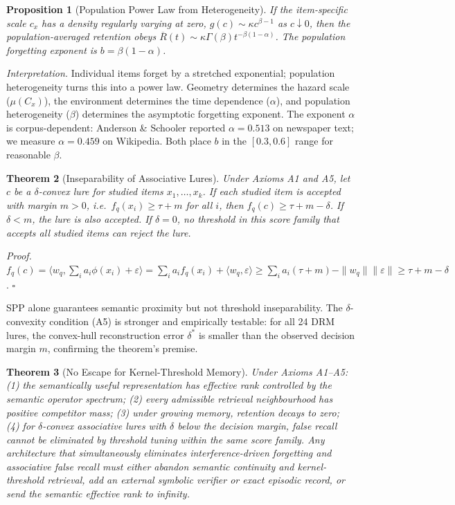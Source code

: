 \documentclass[11pt]{article}
\newtheorem{theorem}{Theorem}
\newtheorem{proposition}[theorem]{Proposition}
\begin{document}
\begin{proposition}[Population Power Law from Heterogeneity]
\label{prop:poplaw}
If the item-specific scale $c_x$ has a density regularly varying at zero, $g(c) \sim \kappa c^{\beta-1}$ as $c \downarrow 0$, then the population-averaged retention obeys $\overline{R}(t) \sim \kappa\Gamma(\beta) t^{-\beta(1-\alpha)}$. The population forgetting exponent is $b = \beta(1-\alpha)$.
\end{proposition}

\noindent\textit{Interpretation.} Individual items forget by a stretched exponential; population heterogeneity turns this into a power law. Geometry determines the hazard scale ($\mu(C_x)$), the environment determines the time dependence ($\alpha$), and population heterogeneity ($\beta$) determines the asymptotic forgetting exponent. The exponent $\alpha$ is corpus-dependent: Anderson \& Schooler\cite{anderson1991} reported $\alpha = 0.513$ on newspaper text; we measure $\alpha = 0.459$ on Wikipedia. Both place $b$ in the $[0.3, 0.6]$ range for reasonable $\beta$.

\begin{theorem}[Inseparability of Associative Lures]
\label{thm:drm}
Under Axioms A1 and A5, let $c$ be a $\delta$-convex lure for studied items $x_1,\ldots,x_k$. If each studied item is accepted with margin $m > 0$, i.e.\ $f_q(x_i) \ge \tau + m$ for all $i$, then $f_q(c) \ge \tau + m - \delta$. If $\delta < m$, the lure is also accepted. If $\delta = 0$, no threshold in this score family that accepts all studied items can reject the lure.
\end{theorem}

\noindent\textit{Proof.} $f_q(c) = \langle w_q, \sum_i a_i \phi(x_i) + \varepsilon\rangle = \sum_i a_i f_q(x_i) + \langle w_q, \varepsilon\rangle \ge \sum_i a_i(\tau + m) - \|w_q\|\|\varepsilon\| \ge \tau + m - \delta$. $\square$

\noindent SPP alone guarantees semantic proximity but not threshold inseparability. The $\delta$-convexity condition (A5) is stronger and empirically testable: for all 24 DRM lures, the convex-hull reconstruction error $\delta^*$ is smaller than the observed decision margin $m$, confirming the theorem's premise.

\begin{theorem}[No Escape for Kernel-Threshold Memory]
\label{thm:noescape}
Under Axioms A1--A5: (1) the semantically useful representation has effective rank controlled by the semantic operator spectrum; (2) every admissible retrieval neighbourhood has positive competitor mass; (3) under growing memory, retention decays to zero; (4) for $\delta$-convex associative lures with $\delta$ below the decision margin, false recall cannot be eliminated by threshold tuning within the same score family. Any architecture that simultaneously eliminates interference-driven forgetting and associative false recall must either abandon semantic continuity and kernel-threshold retrieval, add an external symbolic verifier or exact episodic record, or send the semantic effective rank to infinity.
\end{theorem}
\end{document}
